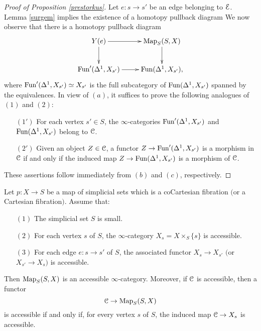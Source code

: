 \begin{proof}[Proof of Proposition \ref{prestorkus}]
Let $e: s \rightarrow s'$ be an edge belonging to $\operatorname{\mathcal{E}}$. Lemma \ref{surgem} implies the existence of a homotopy pullback diagram
We now observe that there is a homotopy pullback diagram 
$$ \xymatrix{ Y(e) \ar[r] \ar[d] & \bHom_{S}(S,X) \ar[d] \\
\Fun'( \Delta^1, X_{s'}) \ar[r] & \Fun( \Delta^1, X_{s'} ), }$$
where $\operatorname{Fun}'( \Delta^1, X_{s'} ) \simeq X_{s'}$ is the full subcategory of $\operatorname{Fun}( \Delta^1, X_{s'} )$ spanned by the equivalences. In view of $(a)$, it suffices to prove the following analogues of $(1)$ and $(2)$:
\begin{itemize}
\item[$(1')$] For each vertex $s' \in S$, the $\infty$-categories
$\operatorname{Fun}'(\Delta^1, X_{s'})$ and $\operatorname{Fun}( \Delta^1, X_{s'})$ belong to $\operatorname{\mathcal{C}}$.
\item[$(2')$] Given an object $Z \in \operatorname{\mathcal{C}}$, a functor 
$Z \rightarrow \operatorname{Fun}'( \Delta^1, X_{s'})$ is a morphism in $\operatorname{\mathcal{C}}$ if and only if the
induced map $Z \rightarrow \operatorname{Fun}( \Delta^1, X_{s'})$ is a morphism of $\operatorname{\mathcal{C}}$.
\end{itemize}
These assertions follow immediately from $(b)$ and $(c)$, respectively.
\end{proof}

\begin{corollary}\label{storkus1}
Let $p: X \rightarrow S$ be a map of simplicial sets which is a coCartesian fibration $($or a Cartesian fibration$)$. Assume that:

\begin{itemize}
\item[$(1)$] The simplicial set $S$ is small.
\item[$(2)$] For each vertex $s$ of $S$, the $\infty$-category $X_{s} = X \times_{S} \{s\}$ is
accessible.
\item[$(3)$] For each edge $e: s \rightarrow s'$ of $S$, the associated functor
$X_{s} \rightarrow X_{s'}$ $($or $X_{s'} \rightarrow X_{s}${}$)$ is accessible. 
\end{itemize}

Then $\operatorname{{Map}}_{S}(S,X)$ is an accessible $\infty$-category. Moreover, if $\operatorname{\mathcal{C}}$ is accessible, then
a functor $$\operatorname{\mathcal{C}} \rightarrow \operatorname{{Map}}_{S}(S,X)$$ is accessible if and only if, for every vertex $s$ of $S$, the induced map $\operatorname{\mathcal{C}} \rightarrow X_{s}$ is accessible.
\end{corollary}


